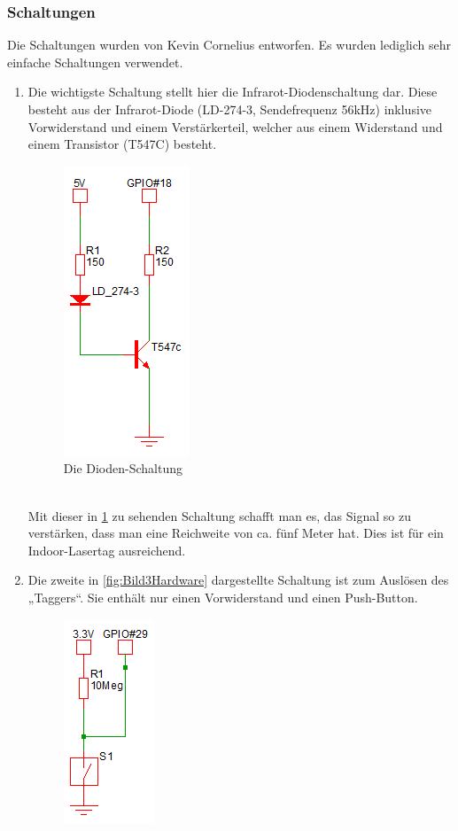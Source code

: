 \subsubsection{Schaltungen}
\label{sec:schaltungen}

Die Schaltungen wurden von Kevin Cornelius entworfen.
Es wurden lediglich sehr einfache Schaltungen verwendet.
\begin{enumerate}
	\item Die wichtigste Schaltung stellt hier die Infrarot-Diodenschaltung dar. Diese besteht aus der Infrarot-Diode (LD-274-3, Sendefrequenz 56kHz) inklusive Vorwiderstand und einem Verstärkerteil, welcher aus einem Widerstand und einem Transistor (T547C) besteht.\\
	\begin{figure}[h]
		\centering
		\includegraphics[width=0.2 \textwidth]{./040-komponenten/010-hardware/Diodenschaltung.png}
		\caption{Die Dioden-Schaltung}
		\label{fig:Bild2Hardware}
	\end{figure}\\
	Mit dieser in \cref{fig:Bild2Hardware} zu sehenden Schaltung schafft man es, das Signal so zu verstärken, dass man eine Reichweite von ca. fünf Meter hat. Dies ist für ein Indoor-Lasertag ausreichend.
	\item Die zweite in \cref{fig:Bild3Hardware} dargestellte Schaltung ist zum Auslösen des „Taggers“. Sie enthält nur einen Vorwiderstand und einen Push-Button. \\
	\begin{figure}[h]
		\centering
		\includegraphics[width=0.2 \textwidth]{./040-komponenten/010-hardware/Button.png}

\end{figure}
\end{enumerate}
